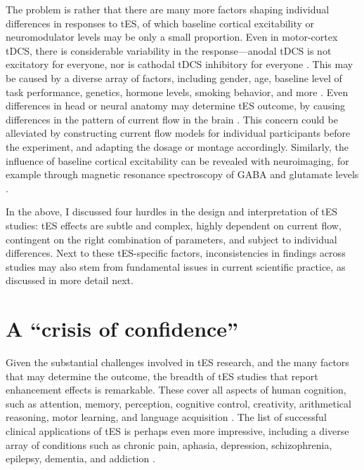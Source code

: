 \documentclass[11pt,english,]{memoir}
\begin{document}
The problem is rather that there are many more factors shaping individual differences in responses to tES, of which baseline cortical excitability or neuromodulator levels may be only a small proportion. Even in motor-cortex tDCS, there is considerable variability in the response---anodal tDCS is not excitatory for everyone, nor is cathodal tDCS inhibitory for everyone \autocites{Chew2015}{Jamil2017}{Lopez-Alonso2014}{Strube2016}{Wiethoff2014}. This may be caused by a diverse array of factors, including gender, age, baseline level of task performance, genetics, hormone levels, smoking behavior, and more \autocites{Krause2014}{Li2015b}. Even differences in head or neural anatomy may determine tES outcome, by causing differences in the pattern of current flow in the brain \autocites{Kim2014}{Laakso2018}. This concern could be alleviated by constructing current flow models for individual participants before the experiment, and adapting the dosage or montage accordingly. Similarly, the influence of baseline cortical excitability can be revealed with neuroimaging, for example through magnetic resonance spectroscopy of GABA and glutamate levels \autocites{Filmer2019}{Talsma2018}.

In the above, I discussed four hurdles in the design and interpretation of tES studies: tES effects are subtle and complex, highly dependent on current flow, contingent on the right combination of parameters, and subject to individual differences. Next to these tES-specific factors, inconsistencies in findings across studies may also stem from fundamental issues in current scientific practice, as discussed in more detail next.

\hypertarget{a-crisis-of-confidence}{%
\section{A ``crisis of confidence''}\label{a-crisis-of-confidence}}

Given the substantial challenges involved in tES research, and the many factors that may determine the outcome, the breadth of tES studies that report enhancement effects is remarkable. These cover all aspects of human cognition, such as attention, memory, perception, cognitive control, creativity, arithmetical reasoning, motor learning, and language acquisition \autocites{Coffman2014}{Dedoncker2016a}{Santarnecchi2015}. The list of successful clinical applications of tES is perhaps even more impressive, including a diverse array of conditions such as chronic pain, aphasia, depression, schizophrenia, epilepsy, dementia, and addiction \autocite{Lefaucheur2016a}.
\end{document}
